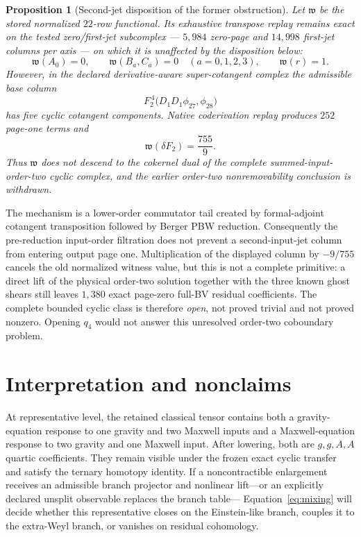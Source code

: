 \documentclass[11pt]{article}
\newtheorem{proposition}[theorem]{Proposition}
\theoremstyle{definition}
\theoremstyle{remark}
\begin{document}
\begin{proposition}[Second-jet disposition of the former obstruction]
\label{thm:filtered-disposition}
Let $\mathfrak w$ be the stored normalized $22$-row functional.  Its
exhaustive transpose replay remains exact on the tested zero/first-jet
subcomplex --- $5{,}984$ zero-page and $14{,}998$ first-jet columns per
axis --- on which it is unaffected by the disposition below:
\begin{equation}
 \mathfrak w(A_0)=0,
 \qquad \mathfrak w(B_a,C_a)=0\quad(a=0,1,2,3),
 \qquad \mathfrak w(r)=1.
\end{equation}
However, in the declared derivative-aware super-cotangent complex the
admissible base column
\begin{equation}
 F_2^{\,4}\bigl(D_1D_1\phi_{27},\phi_{28}\bigr)
\end{equation}
has five cyclic cotangent components.  Native coderivation replay produces
$252$ page-one terms and
\begin{equation}
 \mathfrak w\!\left(\delta F_2\right)=\frac{755}{9}.
\end{equation}
Thus $\mathfrak w$ does not descend to the cokernel dual of the complete
summed-input-order-two cyclic complex, and the earlier order-two
nonremovability conclusion is withdrawn.
\end{proposition}

The mechanism is a lower-order commutator tail created by formal-adjoint
cotangent transposition followed by Berger PBW reduction.  Consequently the
pre-reduction input-order filtration does not prevent a second-input-jet
column from entering output page one.  Multiplication of the displayed column
by $-9/755$ cancels the old normalized witness value, but this is not a
complete primitive: a direct lift of the physical order-two solution together
with the three known ghost shears still leaves $1{,}380$ exact page-zero
full-BV residual coefficients.  The complete bounded cyclic class is
therefore \emph{open}, not proved trivial and not proved nonzero.  Opening
$q_4$ would not answer this unresolved order-two coboundary problem.

\section{Interpretation and nonclaims}\label{sec:interpretation}

At representative level, the retained classical tensor contains both a
gravity-equation response to one gravity and two Maxwell inputs and a
Maxwell-equation response to two gravity and one Maxwell input.  After
lowering, both are $g,g,A,A$ quartic coefficients.  They remain visible under
the frozen exact cyclic transfer and satisfy the ternary homotopy identity.
If a noncontractible enlargement receives an admissible branch projector and
nonlinear lift---or an explicitly declared unsplit observable replaces the
branch table---
Equation~\eqref{eq:mixing} will decide whether this representative closes on
the Einstein-like branch, couples it to the extra-Weyl branch, or vanishes on
residual cohomology.
\end{document}
